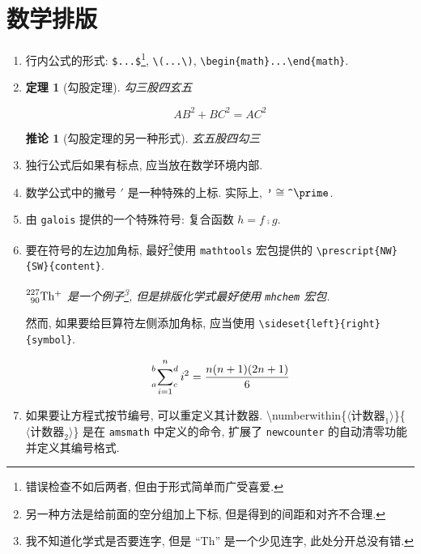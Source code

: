 \documentclass[UTF8,no-math]{ctexart}
\newtheorem{theorem}{定理}
\newtheorem{inference}{推论}[theorem]
\numberwithin{enumi}{section}
\begin{document}
    \section{数学排版}
    \begin{enumerate}
        \item 行内公式的形式: \verb|$...$|\footnote{错误检查不如后两者, 但由于形式简单而广受喜爱.}, \verb|\(...\)|, \verb|\begin{math}...\end{math}|. 
        \item \begin{theorem}[勾股定理]
            勾三股四玄五
        \end{theorem}\begin{equation}\label{eq:1st}
            AB^2+BC^2=AC^2
        \end{equation}
        \begin{inference}[勾股定理的另一种形式]
            玄五股四勾三
        \end{inference}
        \item 独行公式后如果有标点, 应当放在数学环境内部.
        \item 数学公式中的撇号 $'$ 是一种特殊的上标. 实际上, $\verb|'|\cong\verb|^\prime|$. 
        \item 由 \texttt{galois} 提供的一个特殊符号: 复合函数 $h=f\comp g$.
        \item 要在符号的左边加角标, 最好\footnote{另一种方法是给前面的空分组加上下标, 但是得到的间距和对齐不合理.}使用 \texttt{mathtools} 宏包提供的 \verb|\prescript{NW}{SW}{content}|.\par \emph{$\prescript{227}{90}{\mathrm{T\/h}}^{+}$ 是一个例子\footnote{我不知道化学式是否要连字, 但是 ``Th'' 是一个少见连字, 此处分开总没有错.}, 但是排版化学式最好使用 \texttt{mhchem} 宏包. } \par
        然而, 如果要给巨算符左侧添加角标, 应当使用 \verb|\sideset{left}{right}{symbol}|. \par
        \begin{equation}
        \sideset{_a^b}{_c^d}{\sum}_{i=1}^{n} i^2=\frac{n(n+1)(2n+1)}{6}
        \end{equation}  
        \item 如果要让方程式按节编号, 可以重定义其计数器. {\CJKsetecglue{}\ttfamily\textbackslash numberwithin\{$\langle\text{计数器}_1\rangle$\}\{$\langle\text{计数器}_2\rangle$\}} 是在 \texttt{amsmath} 中定义的命令, 扩展了 \texttt{newcounter} 的自动清零功能并定义其编号格式.   %

\end{enumerate}
\end{document}
